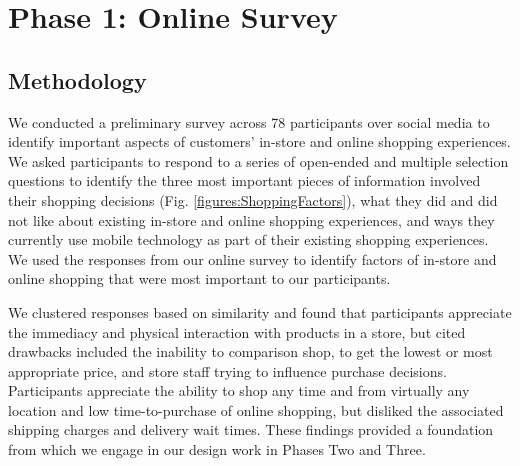 \section{Phase 1: Online Survey}

 \subsection{Methodology}
We conducted a preliminary survey across 78 participants over social media to identify important aspects of customers' in-store and online shopping experiences. We asked participants to respond to a series of open-ended and multiple selection questions to identify the three most important pieces of information involved their shopping decisions (Fig. \ref{figures:ShoppingFactors}), what they did and did not like about existing in-store and online shopping experiences, and ways they currently use mobile technology as part of their existing shopping experiences. 
We used the responses from our online survey to
identify 
factors of in-store and online shopping that were most important to our participants.  

We clustered responses based on similarity and found that
participants appreciate the immediacy and physical interaction with products in a store, but cited drawbacks included the inability to comparison shop, to get the lowest or most appropriate price,
and store staff trying to influence purchase decisions.  Participants appreciate the ability to shop any time and from virtually any location
   and low time-to-purchase of online shopping,  but disliked the associated shipping charges and delivery wait times. 
These findings provided a foundation from which we engage in our design work in Phases Two and Three. 

